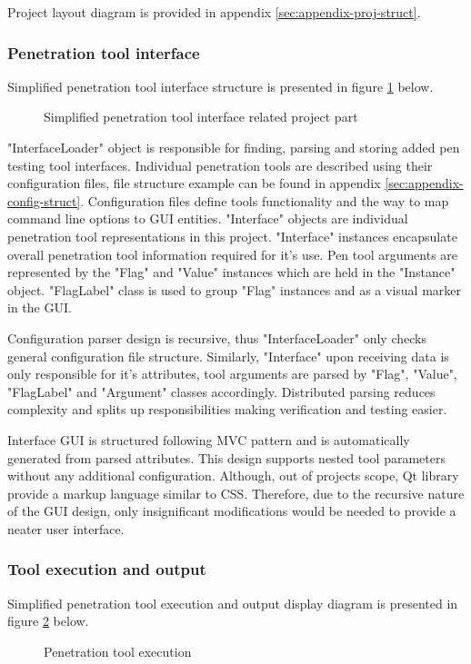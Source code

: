 Project layout diagram is provided in appendix \ref{sec:appendix-proj-struct}.


\subsubsection{Penetration tool interface}
Simplified penetration tool interface structure is presented in figure \ref {fig:interface-struct} below. \newline

\begin{figure}[!htb]
	\caption{\label{fig:interface-struct} Simplified penetration tool interface related project part}
\end{figure}

"InterfaceLoader" object is responsible for finding, parsing and storing added pen testing tool interfaces. Individual penetration tools are described using their configuration files, file structure example can be found in appendix \ref{sec:appendix-config-struct}. Configuration files define tools functionality and the way to map command line options to GUI entities. "Interface" objects are individual penetration tool representations in this project. "Interface" instances encapsulate overall penetration tool information required for it's use. Pen tool arguments are represented by the "Flag" and "Value" instances which are held in the "Instance" object. "FlagLabel" class is used to group "Flag" instances and as a visual marker in the GUI. 

Configuration parser design is recursive, thus "InterfaceLoader" only checks general configuration file structure. Similarly, "Interface" upon receiving data is only responsible for it's attributes, tool arguments are parsed by "Flag", "Value", "FlagLabel" and "Argument" classes accordingly. Distributed parsing reduces complexity and splits up responsibilities making verification and testing easier.

Interface GUI is structured following MVC pattern and is automatically generated from parsed attributes. This design supports nested tool parameters without any additional configuration. Although, out of projects scope, Qt library provide a markup language similar to CSS. Therefore, due to the recursive nature of the GUI design, only insignificant modifications would be needed to provide a neater user interface.


\subsubsection{Tool execution and output}\label{tool-execution}
Simplified penetration tool execution and output display diagram is presented in figure \ref{fig:manager-struct} below.
\begin{figure}[!htb]
	\caption{\label{fig:manager-struct} Penetration tool execution}
\end{figure}


